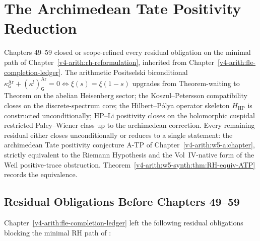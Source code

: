 \chapter{The Archimedean Tate Positivity Reduction}
\label{v4-arith:w5-synth:chapter}

Chapters 49--59 closed or scope-refined every residual obligation
on the minimal path of
Chapter~\ref{v4-arith:rh-reformulation}, inherited from
Chapter~\ref{v4-arith:fle-completion-ledger}. The arithmetic
Positselski biconditional
\(\kappa^{\mathrm{Ar}}_{\mathsf{G}}+(\kappa^{!})^{\mathrm{Ar}}_{\mathsf{G}}=0
\Leftrightarrow \xi(s)=\xi(1-s)\)
upgrades from Theorem-waiting to Theorem on the abelian Heisenberg
sector; the Koszul--Petersson compatibility closes on the
discrete-spectrum core; the Hilbert--P\'{o}lya operator skeleton
\(H_{\mathrm{HP}}\) is constructed unconditionally; HP--Li
positivity closes on the holomorphic cuspidal restricted
Paley--Wiener class up to the archimedean correction. Every
remaining residual either closes unconditionally or reduces to a
single statement: the archimedean Tate positivity conjecture A-TP of
Chapter~\ref{v4-arith:w5-a:chapter}, strictly equivalent to the
Riemann Hypothesis and the Vol~IV-native form of the Weil
positive-trace obstruction.
Theorem~\ref{v4-arith:w5-synth:thm:RH-equiv-ATP} records the
equivalence.

\section{Residual Obligations Before Chapters 49--59}
\label{v4-arith:w5-synth:scope}

Chapter~\ref{v4-arith:fle-completion-ledger} left the following
residual obligations blocking the minimal RH path of
:

